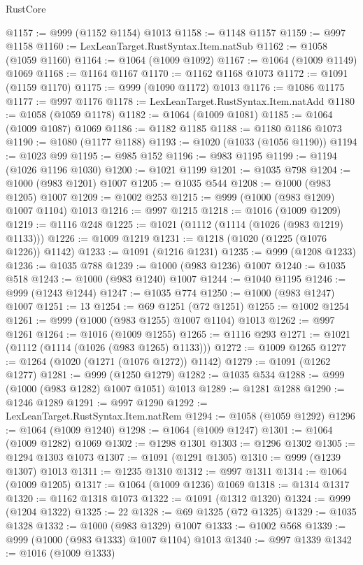 \begin{lexlean}{RustCore}
\begin{coremodule}
@1157 := @999 (@1152 @1154) @1013
@1158 := @1148 @1157
@1159 := @997 @1158
@1160 := LexLeanTarget.RustSyntax.Item.natSub
@1162 := @1058 (@1059 @1160)
@1164 := @1064 (@1009 @1092)
@1167 := @1064 (@1009 @1149) @1069
@1168 := @1164 @1167
@1170 := @1162 @1168 @1073
@1172 := @1091 (@1159 @1170)
@1175 := @999 (@1090 @1172) @1013
@1176 := @1086 @1175
@1177 := @997 @1176
@1178 := LexLeanTarget.RustSyntax.Item.natAdd
@1180 := @1058 (@1059 @1178)
@1182 := @1064 (@1009 @1081)
@1185 := @1064 (@1009 @1087) @1069
@1186 := @1182 @1185
@1188 := @1180 @1186 @1073
@1190 := @1080 (@1177 @1188)
@1193 := @1020 (@1033 (@1056 @1190))
@1194 := @1023 @99
@1195 := @985 @152
@1196 := @983 @1195
@1199 := @1194 (@1026 @1196 @1030)
@1200 := @1021 @1199
@1201 := @1035 @798
@1204 := @1000 (@983 @1201) @1007
@1205 := @1035 @544
@1208 := @1000 (@983 @1205) @1007
@1209 := @1002 @253
@1215 := @999 (@1000 (@983 @1209) @1007 @1104) @1013
@1216 := @997 @1215
@1218 := @1016 (@1009 @1209)
@1219 := @1116 @248
@1225 := @1021 (@1112 (@1114 (@1026 (@983 @1219) @1133)))
@1226 := @1009 @1219
@1231 := @1218 (@1020 (@1225 (@1076 @1226)) @1142)
@1233 := @1091 (@1216 @1231)
@1235 := @999 (@1208 @1233)
@1236 := @1035 @788
@1239 := @1000 (@983 @1236) @1007
@1240 := @1035 @518
@1243 := @1000 (@983 @1240) @1007
@1244 := @1040 @1195
@1246 := @999 (@1243 @1244)
@1247 := @1035 @774
@1250 := @1000 (@983 @1247) @1007
@1251 := 13
@1254 := @69 @1251 (@72 @1251)
@1255 := @1002 @1254
@1261 := @999 (@1000 (@983 @1255) @1007 @1104) @1013
@1262 := @997 @1261
@1264 := @1016 (@1009 @1255)
@1265 := @1116 @293
@1271 := @1021 (@1112 (@1114 (@1026 (@983 @1265) @1133)))
@1272 := @1009 @1265
@1277 := @1264 (@1020 (@1271 (@1076 @1272)) @1142)
@1279 := @1091 (@1262 @1277)
@1281 := @999 (@1250 @1279)
@1282 := @1035 @534
@1288 := @999 (@1000 (@983 @1282) @1007 @1051) @1013
@1289 := @1281 @1288
@1290 := @1246 @1289
@1291 := @997 @1290
@1292 := LexLeanTarget.RustSyntax.Item.natRem
@1294 := @1058 (@1059 @1292)
@1296 := @1064 (@1009 @1240)
@1298 := @1064 (@1009 @1247)
@1301 := @1064 (@1009 @1282) @1069
@1302 := @1298 @1301
@1303 := @1296 @1302
@1305 := @1294 @1303 @1073
@1307 := @1091 (@1291 @1305)
@1310 := @999 (@1239 @1307) @1013
@1311 := @1235 @1310
@1312 := @997 @1311
@1314 := @1064 (@1009 @1205)
@1317 := @1064 (@1009 @1236) @1069
@1318 := @1314 @1317
@1320 := @1162 @1318 @1073
@1322 := @1091 (@1312 @1320)
@1324 := @999 (@1204 @1322)
@1325 := 22
@1328 := @69 @1325 (@72 @1325)
@1329 := @1035 @1328
@1332 := @1000 (@983 @1329) @1007
@1333 := @1002 @568
@1339 := @999 (@1000 (@983 @1333) @1007 @1104) @1013
@1340 := @997 @1339
@1342 := @1016 (@1009 @1333)

\end{coremodule}
\end{lexlean}

